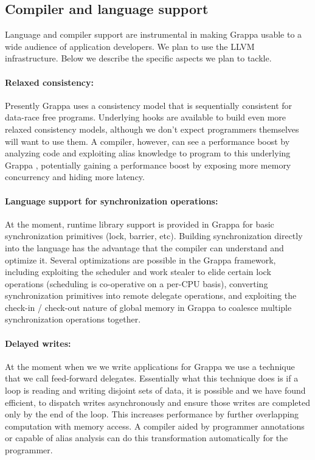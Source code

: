 \subsection{Compiler and language support}

Language and compiler support are instrumental in making Grappa usable to a
wide audience of application developers. We plan to use the LLVM~\cite{llvm}
infrastructure. Below we describe the specific aspects we plan to tackle.

\paragraph{Relaxed consistency:} Presently Grappa uses a consistency model that is sequentially consistent for data-race free programs.  Underlying hooks are available to build even more relaxed consistency models, although we don't expect programmers themselves will want to use them.  A compiler, however, can see a performance boost by analyzing code and exploiting alias knowledge to program to this underlying Grappa \api, potentially gaining a performance boost by exposing more memory concurrency and hiding more latency.

\paragraph{Language support for synchronization operations: } At the moment, runtime library support is provided in Grappa for basic synchronization primitives (lock, barrier, etc).  Building synchronization directly into the language has the advantage that the compiler can understand and optimize it.  Several optimizations are possible in the Grappa framework, including exploiting the scheduler and work stealer to elide certain lock operations (scheduling is co-operative on a per-CPU basis), converting synchronization primitives into remote delegate operations, and exploiting the check-in / check-out nature of global memory in Grappa to coalesce multiple synchronization operations together.

\paragraph{Delayed writes: } At the moment when we we write applications for Grappa we use a technique that we call feed-forward delegates.  Essentially what this technique does is if a loop is reading and writing disjoint sets of data, it is possible and we have found efficient, to dispatch writes asynchronously and ensure those writes are completed only by the end of the loop.  This increases performance by further overlapping computation with memory access.  A compiler aided by programmer annotations or capable of alias analysis can do this transformation automatically for the programmer.

